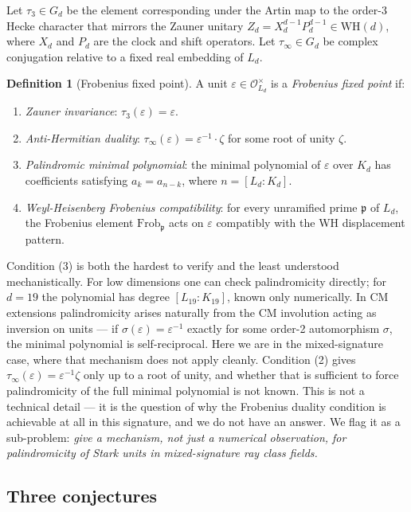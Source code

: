 \documentclass[12pt]{article}
\theoremstyle{plain}
\theoremstyle{definition}
\newtheorem{definitioninner}[theoreminner]{Definition}
\theoremstyle{remark}
\newenvironment{definition}{\begin{mdframed}[style=defstyle]\begin{definitioninner}}{\end{definitioninner}\end{mdframed}}
\newcommand{\WH}{\mathrm{WH}}
\newcommand{\OO}{\mathcal{O}}
\newcommand{\eps}{\varepsilon}
\begin{document}
Let $\tau_3 \in G_d$ be the element corresponding under the Artin map to the order-3 Hecke character that mirrors the Zauner unitary $Z_d = X_d^{d-1} P_d^{d-1} \in \WH(d)$, where $X_d$ and $P_d$ are the clock and shift operators. Let $\tau_\infty \in G_d$ be complex conjugation relative to a fixed real embedding of $L_d$.

\begin{definition}[Frobenius fixed point]
  \label{def:frobenius-fixed}
  A unit $\eps \in \OO_{L_d}^\times$ is a \emph{Frobenius fixed point} if:
  \begin{enumerate}
    \item \emph{Zauner invariance}: $\tau_3(\eps) = \eps$.
    \item \emph{Anti-Hermitian duality}: $\tau_\infty(\eps) = \eps^{-1} \cdot \zeta$ for some root of unity $\zeta$.
    \item \emph{Palindromic minimal polynomial}: the minimal polynomial of $\eps$ over $K_d$ has coefficients satisfying $a_k = a_{n-k}$, where $n = [L_d : K_d]$.
    \item \emph{Weyl-Heisenberg Frobenius compatibility}: for every unramified prime $\mathfrak{p}$ of $L_d$, the Frobenius element $\mathrm{Frob}_\mathfrak{p}$ acts on $\eps$ compatibly with the WH displacement pattern.
  \end{enumerate}
\end{definition}

Condition (3) is both the hardest to verify and the least understood mechanistically. For low dimensions one can check palindromicity directly; for $d = 19$ the polynomial has degree $[L_{19} : K_{19}]$, known only numerically. In CM extensions palindromicity arises naturally from the CM involution acting as inversion on units — if $\sigma(\eps) = \eps^{-1}$ exactly for some order-2 automorphism $\sigma$, the minimal polynomial is self-reciprocal. Here we are in the mixed-signature case, where that mechanism does not apply cleanly. Condition (2) gives $\tau_\infty(\eps) = \eps^{-1}\zeta$ only up to a root of unity, and whether that is sufficient to force palindromicity of the full minimal polynomial is not known. This is not a technical detail — it is the question of why the Frobenius duality condition is achievable at all in this signature, and we do not have an answer. We flag it as a sub-problem: \emph{give a mechanism, not just a numerical observation, for palindromicity of Stark units in mixed-signature ray class fields.}

\subsection{Three conjectures}
\label{subsec:hypotheses}
\end{document}
